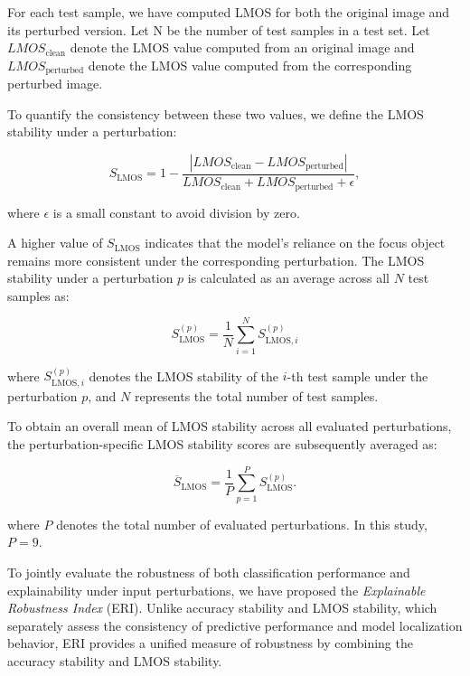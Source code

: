 \documentclass[a4paper,fleqn]{cas-dc}
\begin{document}
For each test sample, we have computed LMOS for both the original image and its perturbed version.  Let N be the number of test samples in a test set. Let $LMOS_{\text{clean}}$ denote the LMOS value computed from an original image and $LMOS_{\text{perturbed}}$ denote the LMOS value computed from the corresponding perturbed image.

To quantify the consistency between these two values, we define the LMOS stability under a perturbation:


\begin{equation}
S_{\text{LMOS}} = 1 - \frac{|LMOS_{\text{clean}} - LMOS_{\text{perturbed}}|}{LMOS_{\text{clean}} + LMOS_{\text{perturbed}} + \epsilon},
\end{equation}

where $\epsilon$ is a small constant to avoid division by zero.

A higher value of $S_{\text{LMOS}}$ indicates that the model's reliance on the focus object remains more consistent under the corresponding perturbation. The LMOS stability under a perturbation $p$ is calculated as an average across all $N$ test samples as:

\begin{equation}
{S}_{\text{LMOS}}^{(p)}
=
\frac{1}{N}
\sum_{i=1}^{N}
S_{\text{LMOS},i}^{(p)}
\end{equation}

where $S_{\text{LMOS},i}^{(p)}$ denotes the LMOS stability of the $i$-th test sample under the perturbation $p$, and $N$ represents the total number of test samples.

To obtain an overall mean of LMOS stability across all evaluated perturbations, the perturbation-specific LMOS stability scores are subsequently averaged as:

\begin{equation}
\overline{S}_{\text{LMOS}}
=
\frac{1}{P}
\sum_{p=1}^{P}
{S}_{\text{LMOS}}^{(p)}.
\end{equation}

where $P$ denotes the total number of evaluated perturbations. In this study, $P=9$.



To jointly evaluate the robustness of both classification performance and explainability under input perturbations, we have proposed the \textit{Explainable Robustness Index} (ERI). Unlike accuracy stability and LMOS stability, which separately assess the consistency of predictive performance and model localization behavior, ERI provides a unified measure of robustness by combining the accuracy stability and LMOS stability.
\end{document}
